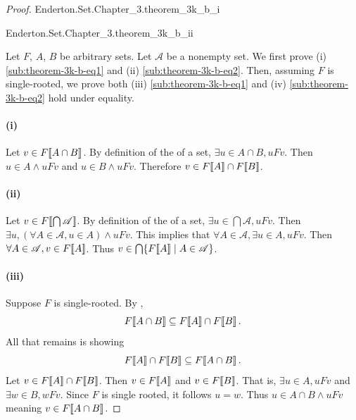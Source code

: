 \documentclass{report}
\begin{document}
\begin{proof}

  \statementpadding

    {Enderton.Set.Chapter\_3.theorem\_3k\_b\_i}

    {Enderton.Set.Chapter\_3.theorem\_3k\_b\_ii}

  Let $F$, $A$, $B$ be arbitrary sets.
  Let $\mathscr{A}$ be a nonempty set.
  We first prove (i) \eqref{sub:theorem-3k-b-eq1} and (ii)
    \eqref{sub:theorem-3k-b-eq2}.
  Then, assuming $F$ is single-rooted, we prove both (iii)
    \eqref{sub:theorem-3k-b-eq1} and (iv) \eqref{sub:theorem-3k-b-eq2} hold
    under equality.

  \paragraph{(i)}%

    Let $v \in F\!\left\llbracket A \cap B\right\rrbracket$.
    By definition of the  of a set,
      $\exists u \in A \cap B, uFv$.
    Then $u \in A \land uFv$ and $u \in B \land uFv$.
    Therefore $v \in F\!\left\llbracket A\right\rrbracket \cap F\!\left\llbracket B\right\rrbracket$.

  \paragraph{(ii)}%

    Let $v \in F\!\left\llbracket\bigcap{\mathscr{A}}\right\rrbracket$.
    By definition of the  of a set,
      $\exists u \in \bigcap{\mathscr{A}}, uFv$.
    Then $\exists u, (\forall A \in \mathscr{A}, u \in A) \land uFv$.
    This implies that $\forall A \in \mathscr{A}, \exists u \in A, uFv$.
    Then $\forall A \in \mathscr{A}, v \in F\!\left\llbracket A\right\rrbracket$.
    Thus $v \in \bigcap\{F\!\left\llbracket A\right\rrbracket \mid A \in \mathscr{A}\}$.

  \paragraph{(iii)}%

    Suppose $F$ is single-rooted.
    By ,
      $$F\!\left\llbracket A \cap B\right\rrbracket \subseteq F\!\left\llbracket A\right\rrbracket \cap F\!\left\llbracket B\right\rrbracket.$$
    All that remains is showing
      $$F\!\left\llbracket A\right\rrbracket \cap F\!\left\llbracket B\right\rrbracket \subseteq F\!\left\llbracket A \cap B\right\rrbracket.$$
    Let $v \in F\!\left\llbracket A\right\rrbracket \cap F\!\left\llbracket B\right\rrbracket$.
    Then $v \in F\!\left\llbracket A\right\rrbracket$ and $v \in F\!\left\llbracket B\right\rrbracket$.
    That is, $\exists u \in A, uFv$ and $\exists w \in B, wFv$.
    Since $F$ is single rooted, it follows $u = w$.
    Thus $u \in A \cap B \land uFv$ meaning $v \in F\!\left\llbracket A \cap B\right\rrbracket$.


\end{proof}
\end{document}
